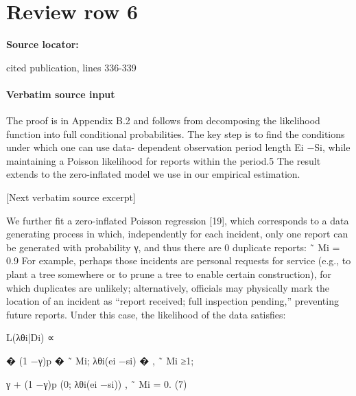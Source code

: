 \documentclass[10pt]{article}
\begin{document}
\section*{Review row 6}
\textbf{Source locator:} {\footnotesize\raggedright cited publication, lines 336-\allowbreak{}339\par}
\paragraph{Verbatim source input}
\begin{ReviewVerbatim}
The proof is in Appendix B.2 and follows from decomposing the likelihood function into full
conditional probabilities. The key step is to find the conditions under which one can use data-
dependent observation period length Ei −Si, while maintaining a Poisson likelihood for reports
within the period.5 The result extends to the zero-inflated model we use in our empirical estimation.

[Next verbatim source excerpt]

We further fit a zero-inflated Poisson regression [19], which corresponds to a data generating
process in which, independently for each incident, only one report can be generated with probability
γ, and thus there are 0 duplicate reports:
˜
Mi = 0.9
For example, perhaps those incidents are
personal requests for service (e.g., to plant a tree somewhere or to prune a tree to enable certain
construction), for which duplicates are unlikely; alternatively, officials may physically mark the
location of an incident as “report received; full inspection pending,” preventing future reports.
Under this case, the likelihood of the data satisfies:

L(λθi|Di) ∝

�
(1 −γ)p
�
˜
Mi; λθi(ei −si)
�
,
˜
Mi ≥1;

γ + (1 −γ)p (0; λθi(ei −si)) ,
˜
Mi = 0.
(7)
\end{ReviewVerbatim}
\end{document}
